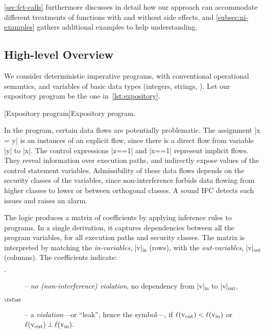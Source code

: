 \autoref{sec:fct-calls} furthermore discusses in detail how our approach can
accommodate different treatments of functions with and without side effects, and
\autoref{subsec:ni-examples} gathers additional examples to help understanding.

\subsection{High-level Overview}
\label{sec:overview}

We consider deterministic imperative programs, with conventional operational
semantics, and variables of basic data types (integers, strings, \etc).
Let our expository program be the one in~\autoref{lst:expository}.

\begin{center}
\begin{minipage}{\textwidth}
\captionsetup{type=lstlisting}
[Expository program]{Expository program.}
\label{lst:expository}
\end{minipage}
\end{center}

In the program, certain data flows are potentially problematic. The assignment
\prc|x = y| is an instances of an explicit flow, since there is a direct flow
from variable \prc|y| to \prc|x|. The control expressions \prc|z==1| and
\prc|x==1| represent implicit flows. They reveal information over execution
paths, and indirectly expose values of the control statement variables.
Admissibility of these data flows depends on the security classes of the
variables, since non-interference forbids data flowing from higher classes to
lower or between orthogonal classes. A sound IFC detects such issues and raises
an alarm.

The logic \lname produces a matrix of coefficients by applying inference rules
to programs. In a single derivation, it captures dependencies between all the
program variables, for all execution paths and security classes. The matrix is
interpreted by matching the \emph{in-variables}, \prc|v|\(_{\text{in}}\) (rows),
with the \emph{out-variables}, \prc|v|\(_{\text{out}}\) (columns).
The coefficients indicate:

\begin{description}

\item[\(\cdot\)] -- \emph{no \emph{(non-interference)} violation}, no dependency
from \prc|v|$_\text{in}$ to \prc|v|$_\text{out}$,

\item[\(\vi\)] -- a \emph{violation}---or \enquote{leak}, hence the symbol---,
if \(\lvl{\prc|v$_{\text{out}}$|} < \lvl{\prc|v$_{\text{in}}$|}\) or
\(\lvl{\prc|v$_{\text{out}}$|} \orth \lvl{\prc|v$_{\text{in}}$|}\).

\end{description}

